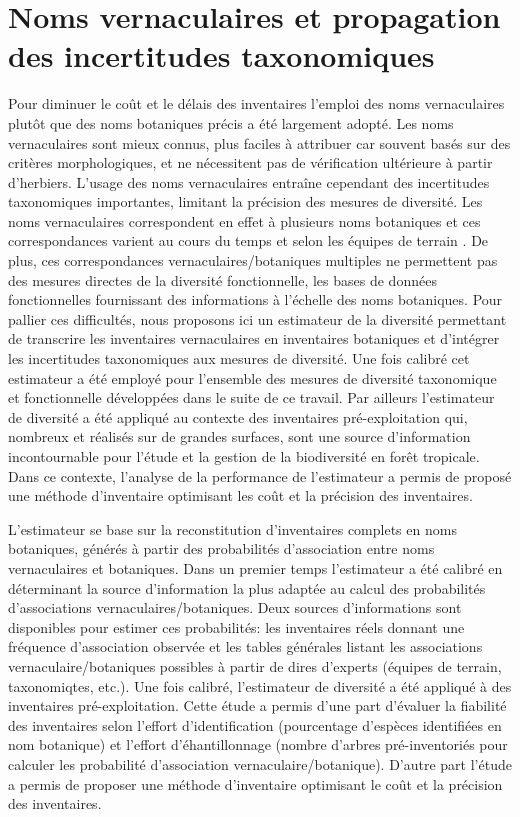 \documentclass[
  11pt,
  french,
  A4paper,
  extrafontsizes,onecolumn,openright
  ]{memoir}
\begin{document}
\section{Noms vernaculaires et propagation des incertitudes
taxonomiques}\label{noms-vernaculaires-et-propagation-des-incertitudes-taxonomiques}

Pour diminuer le coût et le délais des inventaires l'emploi des noms
vernaculaires plutôt que des noms botaniques précis a été largement
adopté. Les noms vernaculaires sont mieux connus, plus faciles à
attribuer car souvent basés sur des critères morphologiques, et ne
nécessitent pas de vérification ultérieure à partir d'herbiers. L'usage
des noms vernaculaires entraîne cependant des incertitudes taxonomiques
importantes, limitant la précision des mesures de diversité. Les noms
vernaculaires correspondent en effet à plusieurs noms botaniques et ces
correspondances varient au cours du temps et selon les équipes de
terrain \autocite{Oldeman1968}. De plus, ces correspondances
vernaculaires/botaniques multiples ne permettent pas des mesures
directes de la diversité fonctionnelle, les bases de données
fonctionnelles fournissant des informations à l'échelle des noms
botaniques. Pour pallier ces difficultés, nous proposons ici un
estimateur de la diversité permettant de transcrire les inventaires
vernaculaires en inventaires botaniques et d'intégrer les incertitudes
taxonomiques aux mesures de diversité. Une fois calibré cet estimateur a
été employé pour l'ensemble des mesures de diversité taxonomique et
fonctionnelle développées dans le suite de ce travail. Par ailleurs
l'estimateur de diversité a été appliqué au contexte des inventaires
pré-exploitation qui, nombreux et réalisés sur de grandes surfaces, sont
une source d'information incontournable
\autocites{terSteege2000}{Guitet2014} pour l'étude et la gestion de la
biodiversité en forêt tropicale. Dans ce contexte, l'analyse de la
performance de l'estimateur a permis de proposé une méthode d'inventaire
optimisant les coût et la précision des inventaires.

L'estimateur se base sur la reconstitution d'inventaires complets en
noms botaniques, générés à partir des probabilités d'association entre
noms vernaculaires et botaniques. Dans un premier temps l'estimateur a
été calibré en déterminant la source d'information la plus adaptée au
calcul des probabilités d'associations vernaculaires/botaniques. Deux
sources d'informations sont disponibles pour estimer ces probabilités:
les inventaires réels donnant une fréquence d'association observée et
les tables générales listant les associations vernaculaire/botaniques
possibles à partir de dires d'experts (équipes de terrain, taxonomiqtes,
etc.). Une fois calibré, l'estimateur de diversité a été appliqué à des
inventaires pré-exploitation. Cette étude a permis d'une part d'évaluer
la fiabilité des inventaires selon l'effort d'identification
(pourcentage d'espèces identifiées en nom botanique) et l'effort
d'éhantillonnage (nombre d'arbres pré-inventoriés pour calculer les
probabilité d'association vernaculaire/botanique). D'autre part l'étude
a permis de proposer une méthode d'inventaire optimisant le coût et la
précision des inventaires.
\end{document}
